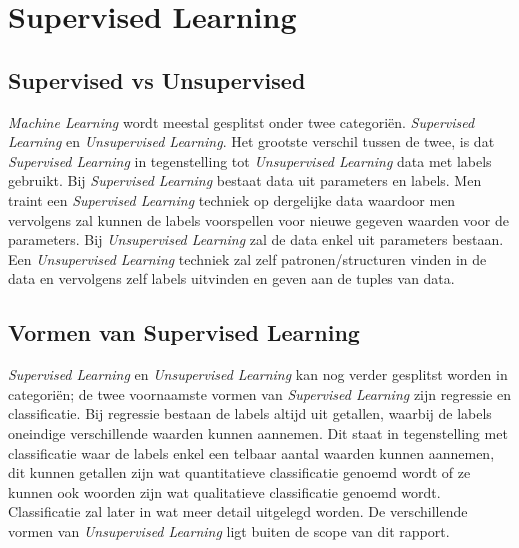 \documentclass[TeamE-eindrapport]{subfiles}
\begin{document}
	
	\chapter{Supervised Learning}
	
	\section{Supervised vs Unsupervised}
	
	\emph{Machine Learning} wordt meestal gesplitst onder twee categoriën. \emph{Supervised Learning} en \emph{Unsupervised Learning}. Het grootste verschil tussen de twee, is dat \emph{Supervised Learning} in tegenstelling tot \emph{Unsupervised Learning} data met labels gebruikt.
	Bij \emph{Supervised Learning} bestaat data uit parameters en labels. Men traint een \emph{Supervised Learning} techniek op dergelijke data waardoor men vervolgens zal kunnen de labels voorspellen voor nieuwe gegeven waarden voor de parameters.
	Bij \emph{Unsupervised Learning} zal de data enkel uit parameters bestaan. Een  \emph{Unsupervised Learning} techniek zal zelf patronen/structuren vinden in de data en vervolgens zelf labels uitvinden en geven aan de tuples van data.
	
	\section{Vormen van Supervised Learning}
	\emph{Supervised Learning} en \emph{Unsupervised Learning} kan nog verder gesplitst worden in categoriën; de twee voornaamste vormen van \emph{Supervised Learning} zijn regressie en classificatie. Bij regressie bestaan de labels altijd uit getallen, waarbij de labels oneindige verschillende waarden kunnen aannemen. Dit staat in tegenstelling met classificatie waar de labels enkel een telbaar aantal waarden kunnen aannemen, dit kunnen getallen zijn wat quantitatieve classificatie genoemd wordt of ze kunnen ook woorden zijn wat qualitatieve classificatie genoemd wordt.
	Classificatie zal later in wat meer detail uitgelegd worden.
	De verschillende vormen van \emph{Unsupervised Learning} ligt buiten de scope van dit rapport.
	
\end{document}
